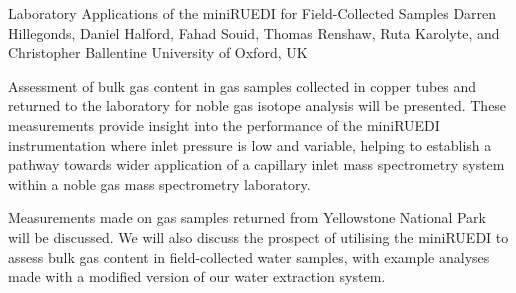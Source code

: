 \begin{conf-abstract}
{Laboratory Applications of the miniRUEDI for Field-Collected Samples}
{Darren Hillegonds, Daniel Halford, Fahad Souid, Thomas Renshaw, Ruta Karolyte, and Christopher Ballentine}
{University of Oxford, UK}
{Assessment of bulk gas content in gas samples collected in copper tubes and returned to the laboratory for noble gas isotope analysis will be presented.  These measurements provide insight into the performance of the miniRUEDI instrumentation where inlet pressure is low and variable, helping to establish a pathway towards wider application of a capillary inlet mass spectrometry system within a noble gas mass spectrometry laboratory. 
 
Measurements made on gas samples returned from Yellowstone National Park will be discussed.  We will also discuss the prospect of utilising the miniRUEDI to assess bulk gas content in field-collected water samples, with example analyses made with a modified version of our water extraction system.}
\end{conf-abstract}

